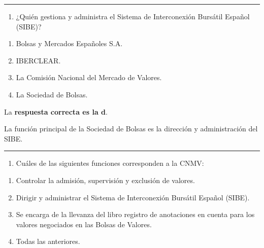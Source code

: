 \documentclass[
  letterpaper,
  DIV=11,
  numbers=noendperiod]{scrreprt}
\providecommand{\tightlist}{%
  \setlength{\itemsep}{0pt}\setlength{\parskip}{0pt}}\usepackage{longtable,booktabs,array}
\begin{document}
\begin{center}\rule{0.5\linewidth}{0.5pt}\end{center}

\begin{enumerate}
\def\labelenumi{\arabic{enumi}.}
\setcounter{enumi}{71}
\tightlist
\item
  ¿Quién gestiona y administra el Sistema de Interconexión Bursátil
  Español (SIBE)?
\end{enumerate}

\begin{enumerate}
\def\labelenumi{\alph{enumi}.}
\item
  Bolsas y Mercados Españoles S.A.
\item
  IBERCLEAR.
\item
  La Comisión Nacional del Mercado de Valores.
\item
  La Sociedad de Bolsas.
\end{enumerate}

\begin{tcolorbox}[enhanced jigsaw, left=2mm, opacityback=0, colback=white, breakable, arc=.35mm, bottomrule=.15mm, rightrule=.15mm, toprule=.15mm, leftrule=.75mm, colframe=quarto-callout-tip-color-frame]
\begin{minipage}[t]{5.5mm}
\textcolor{quarto-callout-tip-color}{\faLightbulb}
\end{minipage}%
\begin{minipage}[t]{\textwidth - 5.5mm}

La \textbf{respuesta correcta es la d}.

La función principal de la Sociedad de Bolsas es la dirección y
administración del SIBE.

\end{minipage}%
\end{tcolorbox}

\begin{center}\rule{0.5\linewidth}{0.5pt}\end{center}

\begin{enumerate}
\def\labelenumi{\arabic{enumi}.}
\setcounter{enumi}{72}
\tightlist
\item
  Cuáles de las siguientes funciones corresponden a la CNMV:
\end{enumerate}

\begin{enumerate}
\def\labelenumi{\alph{enumi}.}
\item
  Controlar la admisión, supervisión y exclusión de valores.
\item
  Dirigir y administrar el Sistema de Interconexión Bursátil Español
  (SIBE).
\item
  Se encarga de la llevanza del libro registro de anotaciones en cuenta
  para los valores negociados en las Bolsas de Valores.
\item
  Todas las anteriores.
\end{enumerate}
\end{document}
